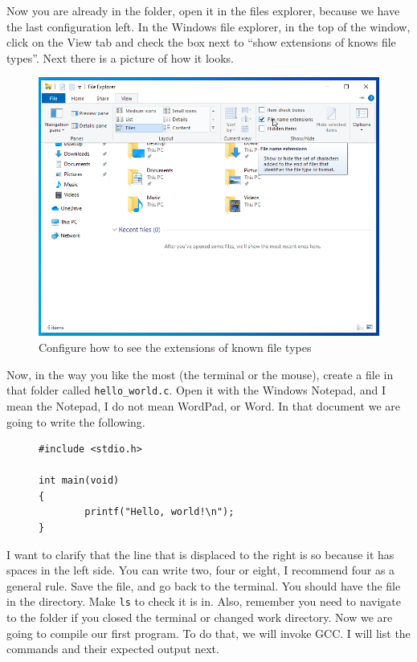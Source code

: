 \documentclass[a4paper]{article}
\begin{document}
Now you are already in the folder, open it in the files explorer, because we
have the last configuration left. In the Windows file explorer, in the top of
the window, click on the View tab and check the box next to ``show extensions
of knows file types''. Next there is a picture of how it looks.

\begin{figure}[H]
    \includegraphics[width=\linewidth]{extensions_en}
    \caption{Configure how to see the extensions of known file types}
    \label{img:extensions}
\end{figure}

Now, in the way you like the most (the terminal or the mouse), create a file
in that folder called \verb!hello_world.c!. Open it with the Windows Notepad,
and I mean the Notepad, I do not mean WordPad, or Word. In that document we are
going to write the following.

\begin{figure}[H]
\begin{verbatim}
#include <stdio.h>

int main(void)
{
        printf("Hello, world!\n");
}
\end{verbatim}
\end{figure}

I want to clarify that the line that is displaced to the right is so because it
has spaces in the left side. You can write two, four or eight, I recommend four
as a general rule. Save the file, and go back to the terminal. You should have
the file in the directory. Make \verb!ls! to check it is in. Also, remember you
need to navigate to the folder if you closed the terminal or changed work
directory. Now we are going to compile our first program. To do that, we will
invoke GCC. I will list the commands and their expected output next.
\end{document}
